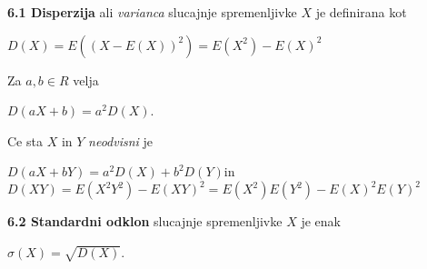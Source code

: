 \documentclass{article}
\begin{document}
\begin{multicols}{2}
	\textbf{6.1 Disperzija} ali \textit{varianca} slucajnje spremenljivke $X$
	je definirana kot
	\begin{center}
		\begin{math}
			D(X) = E((X - E(X))^2) = E(X^2) - E(X)^2
		\end{math}
	\end{center}
	Za $a, b \in R$ velja
	\begin{center}
		\begin{math}
			D(aX + b) = a^2 D(X)
		\end{math}.
	\end{center}
	Ce sta $X$ in $Y$ \textit{neodvisni} je
	\begin{center}
		\begin{small}
			\begin{math}
				D(aX + bY) = a^2D(X) + b^2D(Y)
			\end{math}in
			\begin{math}
				D(XY) = E(X^2Y^2) - E(XY)^2 = E(X^2)E(Y^2) - E(X)^2E(Y)^2
			\end{math}
		\end{small}
	\end{center}

	\textbf{6.2 Standardni odklon} slucajnje spremenljivke $X$
	je enak
	\begin{center}
		\begin{math}
			\sigma(X) = \sqrt{D(X)}
		\end{math}.
	\end{center}


\end{multicols}
\end{document}
